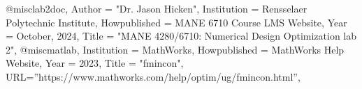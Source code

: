 @misc{lab2doc,
Author = "Dr. Jason Hicken",
Institution = {Rensselaer Polytechnic Institute},
Howpublished = {MANE 6710 Course LMS Website},
Year = {October, 2024},
Title = "MANE 4280/6710: Numerical Design Optimization lab 2",
}
@misc{matlab,
Institution = {MathWorks},
Howpublished = {MathWorks Help Website},
Year = {2023},
Title = "fmincon",
URL=''https://www.mathworks.com/help/optim/ug/fmincon.html'',
}